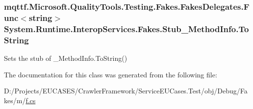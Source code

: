 \hypertarget{class_system_1_1_runtime_1_1_interop_services_1_1_fakes_1_1_stub___method_info_ac767291d4b5854adff6fa25e6974a446}{
\subsubsection[{To\-String}]{\setlength{\rightskip}{0pt plus 5cm}mqttf.\-Microsoft.\-Quality\-Tools.\-Testing.\-Fakes.\-Fakes\-Delegates.\-Func$<$string$>$ System.\-Runtime.\-Interop\-Services.\-Fakes.\-Stub\-\_\-\-Method\-Info.\-To\-String}}\label{class_system_1_1_runtime_1_1_interop_services_1_1_fakes_1_1_stub___method_info_ac767291d4b5854adff6fa25e6974a446}


Sets the stub of \-\_\-\-Method\-Info.\-To\-String()



The documentation for this class was generated from the following file\-:\begin{DoxyCompactItemize}
\item 
D\-:/\-Projects/\-E\-U\-C\-A\-S\-E\-S/\-Crawler\-Framework/\-Service\-E\-U\-Cases.\-Test/obj/\-Debug/\-Fakes/m/\hyperlink{m_2f_8cs}{f.\-cs}\end{DoxyCompactItemize}
